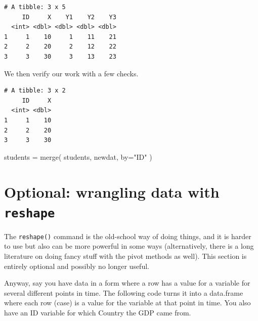 \documentclass[
  letterpaper,
  DIV=11,
  numbers=noendperiod]{scrreprt}
\newenvironment{Shaded}{\begin{snugshade}}{\end{snugshade}}
\newcommand{\AttributeTok}[1]{\textcolor[rgb]{0.49,0.56,0.16}{#1}}
\newcommand{\FunctionTok}[1]{\textcolor[rgb]{0.02,0.16,0.49}{#1}}
\newcommand{\NormalTok}[1]{\textcolor[rgb]{0.00,0.44,0.13}{#1}}
\newcommand{\OtherTok}[1]{\textcolor[rgb]{0.00,0.44,0.13}{#1}}
\newcommand{\SpecialCharTok}[1]{\textcolor[rgb]{0.25,0.44,0.63}{#1}}
\newcommand{\StringTok}[1]{\textcolor[rgb]{0.25,0.44,0.63}{#1}}
\begin{document}
\begin{verbatim}
# A tibble: 3 x 5
     ID     X    Y1    Y2    Y3
  <int> <dbl> <dbl> <dbl> <dbl>
1     1    10     1    11    21
2     2    20     2    12    22
3     3    30     3    13    23
\end{verbatim}

We then verify our work with a few checks.

\begin{Shaded}
\end{Shaded}

\begin{verbatim}
# A tibble: 3 x 2
     ID     X
  <int> <dbl>
1     1    10
2     2    20
3     3    30
\end{verbatim}

\begin{Shaded}
\begin{Highlighting}[]
\NormalTok{students }\OtherTok{=} \FunctionTok{merge}\NormalTok{( students, newdat, }\AttributeTok{by=}\StringTok{"ID"}\NormalTok{ )}
\end{Highlighting}
\end{Shaded}

\hypertarget{optional-wrangling-data-with-reshape}{%
\section{\texorpdfstring{Optional: wrangling data with
\texttt{reshape}}{Optional: wrangling data with reshape}}\label{optional-wrangling-data-with-reshape}}

The \texttt{reshape()} command is the old-school way of doing things,
and it is harder to use but also can be more powerful in some ways
(alternatively, there is a long literature on doing fancy stuff with the
pivot methods as well). This section is entirely optional and possibly
no longer useful.

Anyway, say you have data in a form where a row has a value for a
variable for several different points in time. The following code turns
it into a data.frame where each row (case) is a value for the variable
at that point in time. You also have an ID variable for which Country
the GDP came from.
\end{document}
